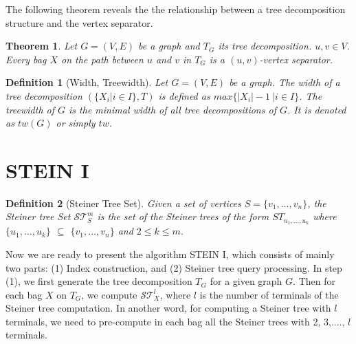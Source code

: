 \documentclass[preprint,12pt]{elsarticle}
\newtheorem{theorem}{Theorem}
\newtheorem{definition}{Definition}
\newtheorem{example}{Example}
\newcommand{\nop}[1]{}
\newcommand{\stset}{\mathcal{ST}}
\begin{document}
The following theorem reveals the the relationship between a tree decomposition structure 
and the vertex separator.

\begin{theorem} \cite{TEDI}
Let $G=(V,E)$ be a graph and $T_G$ its tree decomposition. 
$u, v \in V$.
Every bag $X$ on the path between $u$ and $v$ in $T_G$  
is a $(u,v)$-vertex separator.
\label{the:vsintd}
\end{theorem}








\begin{definition} [Width, Treewidth] 
Let $G = (V,E)$ be a graph.
The \emph{width} of a tree decomposition $(\{X_i \vert i \in I\}, T)$ is defined as $max\{\vert X_i \vert -1 \  \vert i \in I\}$.
The \emph{treewidth} of $G$ is the minimal width of all tree decompositions of $G$. It is denoted as $tw(G)$ or simply $tw$.
\label{def:treewidth}
\end{definition}





\section{STEIN I}


\nop{
\begin{example}
Consider the nice tree decomposition in Figure \ref{fig:nicedecomposition}.
The root of the induced subtree of vertices $v_3$ and $v_{10}$
is $X_{17}$ and $X_4$ respectively.
Then according to Theorem \ref{the:vsintd}, every one from the bags along the path
between $X_{17}$ and $X_4$, namely $X_{17}$, $X_{16}$, $X_{15}$,
$X_{3}$, $X_1$, $X_0$, $X_2$ and $X_4$, is a $(v_3,v_{10})$-vertex separator.
\end{example}
}


\begin{definition}[Steiner Tree Set]
Given a set of vertices $S=\{v_1,\ldots,v_n\}$,
the Steiner tree Set $\stset_S^m$ is the set of the Steiner trees
of the form $ST_{u_1,\ldots,u_k}$ where $\{u_1,\ldots,u_k\}$ $\subseteq$ $\{v_1,\ldots,v_n\}$
and $2 \leq k \leq m$.
\end{definition}


Now we  are ready to present the algorithm STEIN I,
which consists of mainly two parts:
(1) Index construction, and  (2) Steiner tree query processing.
In step (1), we first generate the tree decomposition $T_G$ for a given graph $G$.
Then for each bag $X$ on $T_G$,
we compute   $\stset_X^l$, where $l$ is the number 
of terminals of the Steiner tree computation.
In another word, for computing a Steiner tree with $l$ terminals, 
we need to pre-compute in each bag all the Steiner trees with 2, 3,.$\ldots$, $l$ terminals.
\end{document}

